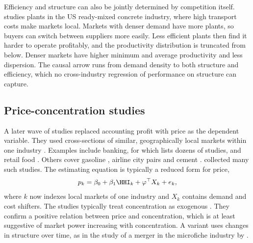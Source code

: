 Efficiency and structure can also be jointly determined by competition itself. \citet{Syverson2004}
studies plants in the US ready-mixed concrete industry, where high transport costs make markets local.
Markets with denser demand have more plants, so buyers can switch between suppliers more easily. Less
efficient plants then find it harder to operate profitably, and the productivity distribution is
truncated from below. Denser markets have higher minimum and average productivity and less dispersion.
The causal arrow runs from demand density to both structure and efficiency, which no cross-industry
regression of performance on structure can capture.

\subsection{Price-concentration studies}\label{sec:01-price-concentration}

A later wave of studies replaced accounting profit with price as the dependent variable. They used
cross-sections of similar, geographically local markets within one industry
\citep[Section~3.5]{Bresnahan1989}. Examples include banking, for which \citet{Rhoades1982} lists dozens
of studies, and retail food \citep{Cotterill1986,Lamm1981}. Others cover gasoline \citep{Marvel1978},
airline city pairs \citep{GrahamKaplanSibley1983} and cement \citep{KollerWeiss1986}. \citet{Weiss1989} collected many such
studies. The estimating equation is typically a reduced form for price,
\begin{equation}\label{eq:01-price-concentration}
p_k = \beta_0 + \beta_1 \HHI_k + \varphi^\top X_k + e_k ,
\end{equation}
where $k$ now indexes local markets of one industry and $X_k$ contains demand and cost shifters. The
studies typically treat concentration as exogenous \citep[p.~1043]{Bresnahan1989}. They confirm a
positive relation between price and concentration, which is at least suggestive of market power
increasing with concentration. A variant uses changes in structure over time, as in the study of a
merger in the microfiche industry by \citet{BartonSherman1984}.

